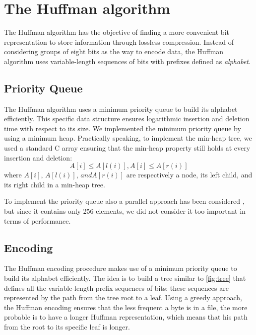 \section{The Huffman algorithm}
The Huffman algorithm has the objective of finding a more convenient bit representation to store information through lossless compression. Instead of considering groups of eight bits as the way to encode data, the Huffman algorithm uses variable-length sequences of bits with prefixes defined as \emph{alphabet}.

\subsection{Priority Queue}
The Huffman algorithm uses a minimum priority queue to build its alphabet efficiently. This specific data structure ensures logarithmic insertion and deletion time with respect to its size.
We implemented the minimum priority queue by using a minimum heap. Practically speaking, to implement the min-heap tree, we used a standard C array ensuring that the min-heap property still holds at every insertion and deletion:
\begin{equation}
    A[i] \le A[l(i)], A[i] \le A[r(i)]
\end{equation}
where \(A[i]\), \(A[l(i)]\), \(and A[r(i)]\) are respectively a node, its left child, and its right child in a min-heap tree.

To implement the priority queue also a parallel approach has been considered \cite{BRODAL19984}, but since it contains only 256 elements, we did not consider it too important in terms of performance.

\subsection{Encoding}
The Huffman encoding procedure makes use of a minimum priority queue to build its alphabet efficiently. The idea is to build a tree similar to \cref{fig:tree} that defines all the variable-length prefix sequences of bits: these sequences are represented by the path from the tree root to a leaf. Using a greedy approach, the Huffman encoding ensures that the less frequent a byte is in a file, the more probable is to have a longer Huffman representation, which means that his path from the root to its specific leaf is longer.

